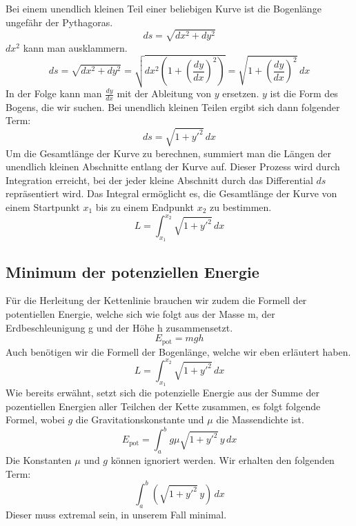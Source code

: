 Bei einem unendlich kleinen Teil einer beliebigen Kurve ist die Bogenlänge ungefähr der Pythagoras.
\begin{equation}
	ds
	=
	\sqrt{dx^2 + dy^2}
	\label{kettenlinie:equation1}
\end{equation}
\(dx^2\) kann man ausklammern.
\begin{equation}
	ds
	=
	\sqrt{dx^2 + dy^2}
	=
	\sqrt{dx^2 \left( 1 + \left( \frac{dy}{dx} \right)^2 \right)}
	=
	\sqrt{1 + \left( \frac{dy}{dx} \right)^2} \, dx
\end{equation}
In der Folge kann man \(\frac{dy}{dx}\) mit der Ableitung von \(y\) ersetzen.
\(y\) ist die Form des Bogens, die wir suchen.
Bei unendlich kleinen Teilen ergibt sich dann folgender Term:
\begin{equation}
	ds
	=
	\sqrt{1 + y'^2} \, dx
\end{equation}
Um die Gesamtlänge der Kurve zu berechnen, summiert man die Längen der unendlich kleinen Abschnitte entlang der Kurve auf.
Dieser Prozess wird durch Integration erreicht, bei der jeder kleine Abschnitt durch das Differential \(ds\) repräsentiert wird.
Das Integral ermöglicht es, die Gesamtlänge der Kurve von einem Startpunkt \(x_1\) bis zu einem Endpunkt \(x_2\) zu bestimmen.
\begin{equation}
	L
	=
	\int_{x_1}^{x_2} \sqrt{1 + y'^2} \, dx
\end{equation}

\subsection{Minimum der potenziellen Energie
\label{kettenlinie:subsection:Minimum der potenziellen Energie}}
Für die Herleitung der Kettenlinie brauchen wir zudem die Formell der potentiellen Energie, welche sich wie folgt aus der Masse m, der Erdbeschleunigung g und der Höhe h zusammensetzt.
\begin{equation}
	E_{\text{pot}}
	=
	mgh
\end{equation}
Auch benötigen wir die Formell der Bogenlänge, welche wir eben erläutert haben.
\begin{equation}
	L
	=
	\int_{x_1}^{x_2} \sqrt{1 + y'^2} \, dx
\end{equation}
Wie bereits erwähnt, setzt sich die potenzielle Energie aus der Summe der pozentiellen Energien aller Teilchen der Kette zusammen, es folgt folgende Formel, wobei \(g\) die Gravitationskonstante und \(\mu\) die Massendichte ist.
\begin{equation}
	E_{\text{pot}}
	=
	\int_{a}^{b} g \mu \sqrt{1 + y'^2} \, y \, dx
\end{equation}
Die Konstanten \(\mu\) und \(g\) können ignoriert werden.
Wir erhalten den folgenden Term:
\begin{equation}
	\int_{a}^{b} (\sqrt{1 + y'^2} \, y) \, dx
\end{equation}
Dieser muss extremal sein, in unserem Fall minimal.

